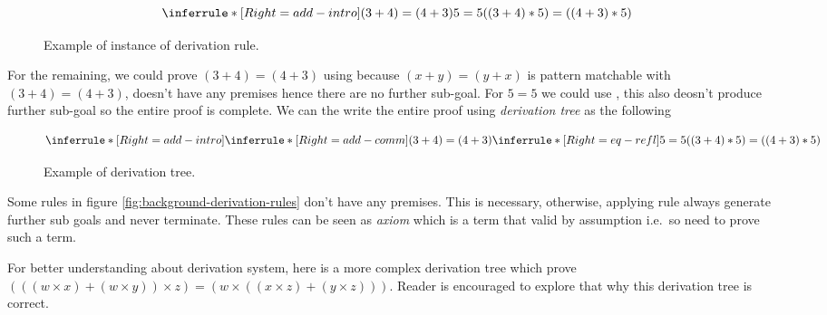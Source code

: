 \documentclass[master.tex]{subfiles}
\begin{document}
\begin{figure}[H]
\centering
$$ \derivTree{add-intro}{((3 + 4) * 5) = ((4 + 3) * 5)}{(3 + 4) = (4 + 3) \\ 5 = 5} $$
\caption{Example of instance of derivation rule.}
\end{figure}

For the remaining, we could prove $(3 + 4) = (4 + 3)$ using
 because $(x + y) = (y + x)$ is pattern matchable with $(3
+ 4) = (4 + 3)$,  doesn't have any premises hence there are
no further sub-goal. For $5 = 5$ we could use , this also
deosn't produce further sub-goal so the entire proof is complete. We can the
write the entire proof using \emph{derivation tree} as the following

\begin{figure}[H]
\centering
$$ \derivTree{add-intro}{((3 + 4) * 5) = ((4 + 3) * 5)}
     {\derivTree{add-comm}{(3 + 4) = (4 + 3)}{ } \\ \\ \\
      \derivTree{eq-refl}{5 = 5}{ }} $$
\caption{Example of derivation tree.}
\end{figure}

Some rules in figure \ref{fig:background-derivation-rules} don't have any
premises. This is necessary, otherwise, applying rule always generate further
sub goals and never terminate. These rules can be seen as \emph{axiom} which is
a term that valid by assumption i.e.\ so need to prove such a term.

For better understanding about derivation system, here is a more complex
derivation tree which prove $(((w \times x) + (w \times y)) \times z) = (w \times ((x \times z) + (y
\times z)))$. Reader is encouraged to explore that why this derivation tree is
correct.
\end{document}
